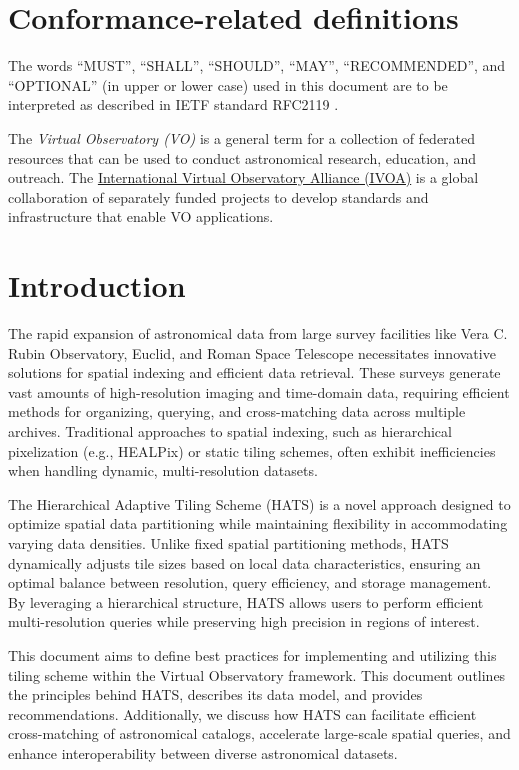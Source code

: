 \documentclass[11pt,a4paper]{ivoa}
\begin{document}
\section*{Conformance-related definitions}
The words ``MUST'', ``SHALL'', ``SHOULD'', ``MAY'', ``RECOMMENDED'', and
``OPTIONAL'' (in upper or lower case) used in this document are to be
interpreted as described in IETF standard RFC2119 \citep{std:RFC2119}.

The \emph{Virtual Observatory (VO)} is a
general term for a collection of federated resources that can be used
to conduct astronomical research, education, and outreach.
The \href{https://www.ivoa.net}{International
Virtual Observatory Alliance (IVOA)} is a global
collaboration of separately funded projects to develop standards and
infrastructure that enable VO applications.

\section{Introduction}
The rapid expansion of astronomical data from large survey facilities like Vera C. Rubin Observatory, Euclid, and Roman Space Telescope necessitates innovative solutions for spatial indexing and efficient data retrieval. 
These surveys generate vast amounts of high-resolution imaging and time-domain data, requiring efficient methods for organizing, querying, and cross-matching data across multiple archives. 
Traditional approaches to spatial indexing, such as hierarchical pixelization (e.g., HEALPix) or static tiling schemes, often exhibit inefficiencies when handling dynamic, multi-resolution datasets.

The Hierarchical Adaptive Tiling Scheme (HATS) is a novel approach designed to optimize spatial data partitioning while maintaining flexibility in accommodating varying data densities. 
Unlike fixed spatial partitioning methods, HATS dynamically adjusts tile sizes based on local data characteristics, ensuring an optimal balance between resolution, query efficiency, and storage management. 
By leveraging a hierarchical structure, HATS allows users to perform efficient multi-resolution queries while preserving high precision in regions of interest.

This document aims to define best practices for implementing and utilizing this tiling scheme within the Virtual Observatory framework. 
This document outlines the principles behind HATS, describes its data model, and provides recommendations. 
Additionally, we discuss how HATS can facilitate efficient cross-matching of astronomical catalogs, accelerate large-scale spatial queries, and enhance interoperability between diverse astronomical datasets.
\end{document}
